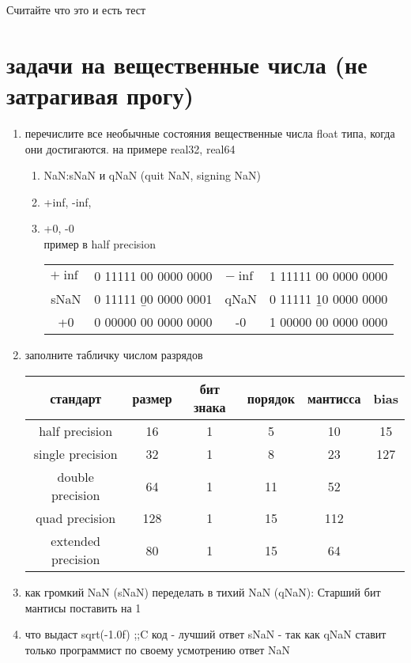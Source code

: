 \documentclass[a4paper,10pt]{article}
\begin{document}
Считайте что это и есть тест

\section*{задачи на вещественные числа (не затрагивая прогу)}
\begin{enumerate}
    \item перечислите все необычные состояния вещественные числа float типа, когда они достигаются. на примере real32, real64
    \begin{enumerate}
        \item NaN:sNaN и qNaN (quit NaN, signing NaN)
        \item +inf, -inf,
        \item +0, -0 \\
        пример в half precision \\
        \begin{tabular}{c c|c c}
            $+\inf$ & 0 11111 00 0000 0000& $-\inf$& 1 11111 00 0000 0000\\
            sNaN & 0 11111 \b{0}0 0000 0001 & qNaN& 0 11111 \b{1}0 0000 0000\\
            +0 & 0 00000 00 0000 0000 & -0 & 1 00000 00 0000 0000\\
        \end{tabular}
    \end{enumerate}
    \item заполните табличку числом разрядов \\
    \begin{tabular}{|c|c|c|c|c|c|}
        \hline
        стандарт& размер & бит знака & порядок & мантисса & bias \\
        \hline
        half precision & 16 & 1 & 5 & 10& 15\\
        \hline
        single precision & 32 & 1 & 8 & 23 & 127\\
        \hline
        double precision & 64 & 1 & 11 & 52 & \\
        \hline
        quad precision &128 & 1 & 15 & 112 & \\
        \hline
        extended precision &80& 1 & 15 & 64 & \\
        \hline
    \end{tabular}
    \item как громкий NaN (sNaN) переделать в тихий NaN (qNaN): Старший бит мантисы поставить на 1 
    \item что выдаст sqrt(-1.0f) ;;C код - лучший ответ sNaN - так как qNaN ставит только программист по своему усмотрению ответ NaN

\end{enumerate}
\end{document}
